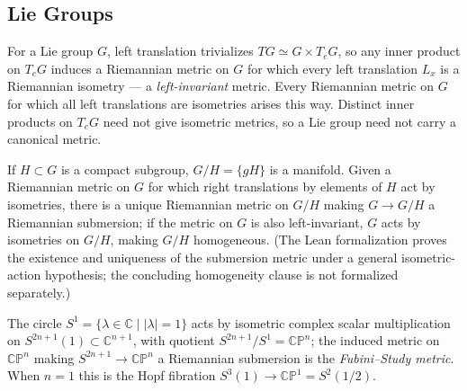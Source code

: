 \subsection{Lie Groups}

\begin{definition}
  \label{def:pet-ch1-left-invariant-metric}
  \leanok
  For a Lie group $G$, left translation trivializes $TG\simeq G\times T_eG$, so
  any inner product on $T_eG$ induces a Riemannian metric on $G$ for which every
  left translation $L_x$ is a Riemannian isometry — a \emph{left-invariant}
  metric. Every Riemannian metric on $G$ for which all left translations are
  isometries arises this way. Distinct inner products on $T_eG$ need not give
  isometric metrics, so a Lie group need not carry a canonical metric.
\end{definition}

\begin{remark}
  \label{rem:pet-ch1-quotient-submersion}
  \leanok
  If $H\subset G$ is a compact subgroup, $G/H=\{gH\}$ is a manifold. Given a
  Riemannian metric on $G$ for which right translations by elements of $H$ act by
  isometries, there is a unique Riemannian metric on $G/H$ making $G\to G/H$ a
  Riemannian submersion; if the metric on $G$ is also left-invariant, $G$ acts by
  isometries on $G/H$, making $G/H$ homogeneous.
  (The Lean formalization proves the existence and uniqueness of the submersion
  metric under a general isometric-action hypothesis; the concluding homogeneity
  clause is not formalized separately.)
\end{remark}

\begin{example}
  \label{ex:pet-ch1-fubini-study}
  \leanok
  The circle $S^1=\{\lambda\in\mathbb{C}\mid|\lambda|=1\}$ acts by isometric complex
  scalar multiplication on $S^{2n+1}(1)\subset\mathbb{C}^{n+1}$, with quotient
  $S^{2n+1}/S^1=\mathbb{CP}^n$; the induced metric on $\mathbb{CP}^n$ making
  $S^{2n+1}\to\mathbb{CP}^n$ a Riemannian submersion is the \emph{Fubini--Study metric}.
  When $n=1$ this is the Hopf fibration $S^3(1)\to\mathbb{CP}^1=S^2(1/2)$.
\end{example}

